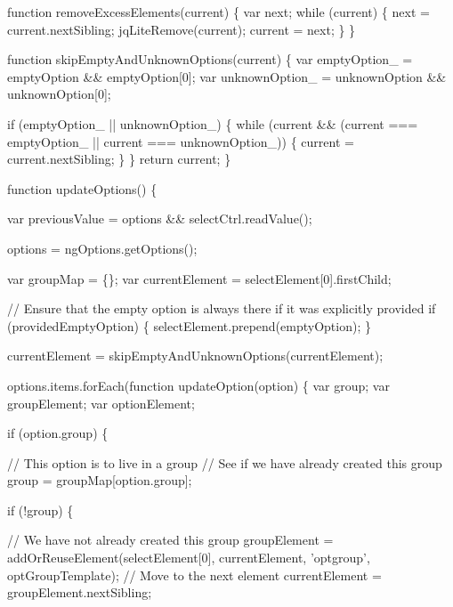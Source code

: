 \begin{DoxyCodeInclude}
{{{      \textcolor{keyword}{function} removeExcessElements(current) \{
        var next;
        \textcolor{keywordflow}{while} (current) \{
          next = current.nextSibling;
          jqLiteRemove(current);
          current = next;
        \}
      \}


      \textcolor{keyword}{function} skipEmptyAndUnknownOptions(current) \{
        var emptyOption\_ = emptyOption && emptyOption[0];
        var unknownOption\_ = unknownOption && unknownOption[0];

        \textcolor{keywordflow}{if} (emptyOption\_ || unknownOption\_) \{
          \textcolor{keywordflow}{while} (current &&
                (current === emptyOption\_ ||
                current === unknownOption\_)) \{
            current = current.nextSibling;
          \}
        \}
        \textcolor{keywordflow}{return} current;
      \}


      \textcolor{keyword}{function} updateOptions() \{

        var previousValue = options && selectCtrl.readValue();

        options = ngOptions.getOptions();

        var groupMap = \{\};
        var currentElement = selectElement[0].firstChild;

        \textcolor{comment}{// Ensure that the empty option is always there if it was explicitly provided}
        \textcolor{keywordflow}{if} (providedEmptyOption) \{
          selectElement.prepend(emptyOption);
        \}

        currentElement = skipEmptyAndUnknownOptions(currentElement);

        options.items.forEach(\textcolor{keyword}{function} updateOption(option) \{
          var group;
          var groupElement;
          var optionElement;

          \textcolor{keywordflow}{if} (option.group) \{

            \textcolor{comment}{// This option is to live in a group}
            \textcolor{comment}{// See if we have already created this group}
            group = groupMap[option.group];

            if (!group) \{

              \textcolor{comment}{// We have not already created this group}
              groupElement = addOrReuseElement(selectElement[0],
                                               currentElement,
                                               \textcolor{stringliteral}{'optgroup'},
                                               optGroupTemplate);
              \textcolor{comment}{// Move to the next element}
              currentElement = groupElement.nextSibling;

}}}
\end{DoxyCodeInclude}
